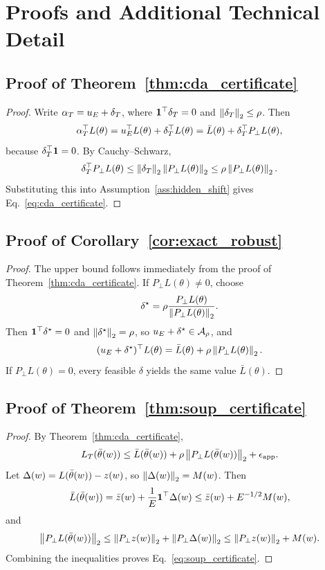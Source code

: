 \section{Proofs and Additional Technical Detail}

\subsection{Proof of Theorem~\ref{thm:cda_certificate}}

\begin{proof}
Write \(\alpha_T=u_E+\delta_T\), where \(\mathbf{1}^\top\delta_T=0\) and \(\left\lVert \delta_T \right\rVert_2\le \rho\). Then
\[
\alpha_T^\top L(\theta)
=
u_E^\top L(\theta)+\delta_T^\top L(\theta)
=
\bar L(\theta)+\delta_T^\top P_\perp L(\theta),
\]
because \(\delta_T^\top\mathbf{1}=0\). By Cauchy--Schwarz,
\[
\delta_T^\top P_\perp L(\theta)
\le
\left\lVert \delta_T \right\rVert_2\left\lVert P_\perp L(\theta) \right\rVert_2
\le
\rho\left\lVert P_\perp L(\theta) \right\rVert_2.
\]
Substituting this into Assumption~\ref{ass:hidden_shift} gives Eq.~\eqref{eq:cda_certificate}.
\end{proof}

\subsection{Proof of Corollary~\ref{cor:exact_robust}}

\begin{proof}
The upper bound follows immediately from the proof of Theorem~\ref{thm:cda_certificate}. If \(P_\perp L(\theta)\neq 0\), choose
\[
\delta^\star=\rho\frac{P_\perp L(\theta)}{\left\lVert P_\perp L(\theta) \right\rVert_2}.
\]
Then \(\mathbf{1}^\top \delta^\star = 0\) and \(\left\lVert \delta^\star \right\rVert_2 = \rho\), so \(u_E+\delta^\star\in\mathcal{A}_\rho\), and
\[
(u_E+\delta^\star)^\top L(\theta)
=
\bar L(\theta)+\rho\left\lVert P_\perp L(\theta) \right\rVert_2.
\]
If \(P_\perp L(\theta)=0\), every feasible \(\delta\) yields the same value \(\bar L(\theta)\).
\end{proof}

\subsection{Proof of Theorem~\ref{thm:soup_certificate}}

\begin{proof}
By Theorem~\ref{thm:cda_certificate},
\[
L_T(\bar{\theta}(w))
\le
\bar L(\bar{\theta}(w))+\rho\left\lVert P_\perp L(\bar{\theta}(w)) \right\rVert_2+\epsilon_{\rm app}.
\]
Let \(\Delta(w)=L(\bar{\theta}(w))-z(w)\), so \(\left\lVert \Delta(w) \right\rVert_2=M(w)\). Then
\[
\bar L(\bar{\theta}(w))
=
\bar z(w)+\frac{1}{E}\mathbf{1}^\top\Delta(w)
\le
\bar z(w)+E^{-1/2}M(w),
\]
and
\[
\left\lVert P_\perp L(\bar{\theta}(w)) \right\rVert_2
\le
\left\lVert P_\perp z(w) \right\rVert_2+\left\lVert P_\perp \Delta(w) \right\rVert_2
\le
\left\lVert P_\perp z(w) \right\rVert_2+M(w).
\]
Combining the inequalities proves Eq.~\eqref{eq:soup_certificate}.
\end{proof}

